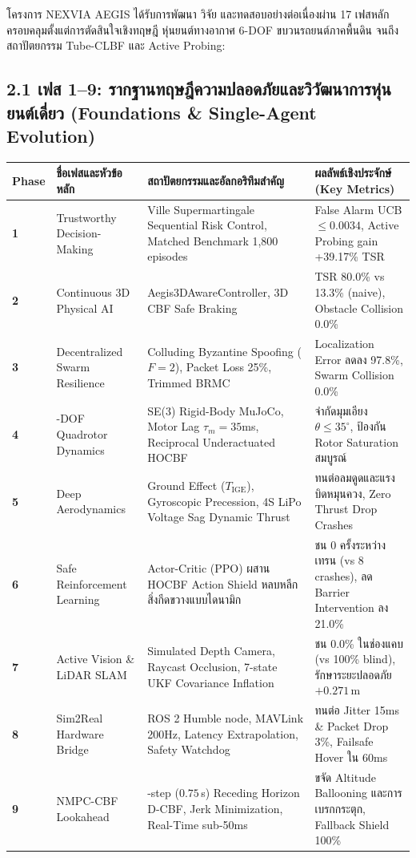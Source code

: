 \documentclass[10pt,a4paper]{article}
\begin{document}
โครงการ NEXVIA AEGIS ได้รับการพัฒนา วิจัย และทดสอบอย่างต่อเนื่องผ่าน 17 เฟสหลัก ครอบคลุมตั้งแต่การตัดสินใจเชิงทฤษฎี หุ่นยนต์ทางอากาศ 6-DOF ขบวนรถยนต์ภาคพื้นดิน จนถึงสถาปัตยกรรม Tube-CLBF และ Active Probing:

\vspace{3pt}
\subsection*{\normalsize 2.1 เฟส 1--9: รากฐานทฤษฎีความปลอดภัยและวิวัฒนาการหุ่นยนต์เดี่ยว (Foundations \& Single-Agent Evolution)}
\vspace{-3pt}

\begin{center}
\footnotesize
\begin{tabularx}{\textwidth}{>{\centering\arraybackslash}p{0.6cm} >{\raggedright\arraybackslash}p{3.2cm} >{\raggedright\arraybackslash}X >{\raggedright\arraybackslash}p{4.7cm}}
\toprule
\textbf{Phase} & \textbf{ชื่อเฟสและหัวข้อหลัก} & \textbf{สถาปัตยกรรมและอัลกอริทึมสำคัญ} & \textbf{ผลลัพธ์เชิงประจักษ์ (Key Metrics)} \\
\midrule
\textbf{1} & Trustworthy Decision-Making & Ville Supermartingale Sequential Risk Control, Matched Benchmark 1,800 episodes & False Alarm UCB $\le 0.0034$, Active Probing gain +39.17\% TSR \\
\textbf{2} & Continuous 3D Physical AI & Aegis3DAwareController, 3D CBF Safe Braking & TSR 80.0\% vs 13.3\% (naive), Obstacle Collision 0.0\% \\
\textbf{3} & Decentralized Swarm Resilience & Colluding Byzantine Spoofing ($F=2$), Packet Loss 25\%, Trimmed BRMC & Localization Error ลดลง 97.8\%, Swarm Collision 0.0\% \\
\textbf{4} & 6-DOF Quadrotor Dynamics & SE(3) Rigid-Body MuJoCo, Motor Lag $\tau_m=35$ms, Reciprocal Underactuated HOCBF & จำกัดมุมเอียง $\theta \le 35^\circ$, ป้องกัน Rotor Saturation สมบูรณ์ \\
\textbf{5} & Deep Aerodynamics & Ground Effect ($T_{\text{IGE}}$), Gyroscopic Precession, 4S LiPo Voltage Sag Dynamic Thrust & ทนต่อลมดูดและแรงบิดหมุนควง, Zero Thrust Drop Crashes \\
\textbf{6} & Safe Reinforcement Learning & Actor-Critic (PPO) ผสาน HOCBF Action Shield หลบหลีกสิ่งกีดขวางแบบไดนามิก & ชน 0 ครั้งระหว่างเทรน (vs 8 crashes), ลด Barrier Intervention ลง 21.0\% \\
\textbf{7} & Active Vision \& LiDAR SLAM & Simulated Depth Camera, Raycast Occlusion, 7-state UKF Covariance Inflation & ชน 0.0\% ในช่องแคบ (vs 100\% blind), รักษาระยะปลอดภัย $+0.271\,$m \\
\textbf{8} & Sim2Real Hardware Bridge & ROS 2 Humble node, MAVLink 200Hz, Latency Extrapolation, Safety Watchdog & ทนต่อ Jitter 15ms \& Packet Drop 3\%, Failsafe Hover ใน 60ms \\
\textbf{9} & NMPC-CBF Lookahead & 15-step ($0.75\,$s) Receding Horizon D-CBF, Jerk Minimization, Real-Time sub-50ms & ขจัด Altitude Ballooning และการเบรกกระตุก, Fallback Shield 100\% \\
\bottomrule
\end{tabularx}
\end{center}
\end{document}
